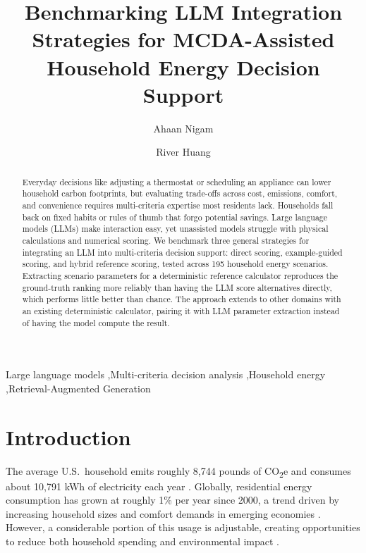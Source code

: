 \documentclass[final,3p,times]{elsarticle}
\def\corref#1{}%
\begin{document}
\begin{frontmatter}
\title{Benchmarking LLM Integration Strategies for MCDA-Assisted Household Energy Decision Support}
\author{Ahaan Nigam\corref{cor1}}
\author{River Huang}
\begin{abstract}
Everyday decisions like adjusting a thermostat or scheduling an appliance can lower household carbon footprints, but evaluating trade-offs across cost, emissions, comfort, and convenience requires multi-criteria expertise most residents lack. Households fall back on fixed habits or rules of thumb that forgo potential savings. Large language models (LLMs) make interaction easy, yet unassisted models struggle with physical calculations and numerical scoring. We benchmark three general strategies for integrating an LLM into multi-criteria decision support: direct scoring, example-guided scoring, and hybrid reference scoring, tested across 195 household energy scenarios. Extracting scenario parameters for a deterministic reference calculator reproduces the ground-truth ranking more reliably than having the LLM score alternatives directly, which performs little better than chance. The approach extends to other domains with an existing deterministic calculator, pairing it with LLM parameter extraction instead of having the model compute the result.\end{abstract}
\begin{keyword}
Large language models \sep Multi-criteria decision analysis  \sep Household energy \sep Retrieval-Augmented Generation 
\end{keyword}
\end{frontmatter}

\section{Introduction}
\label{sec1}
The average U.S.\ household emits roughly 8{,}744 pounds of CO\textsubscript{2}e and consumes about 10{,}791 kWh of electricity each year \cite{epa_household2024,eia_faq_electricity2024}. Globally, residential energy consumption has grown at roughly 1\% per year since 2000, a trend driven by increasing household sizes and comfort demands in emerging economies \cite{GONZALEZTORRES2022112428}. However, a considerable portion of this usage is adjustable, creating opportunities to reduce both household spending and environmental impact \cite{dietz2009,ohler2020}.
\end{document}

